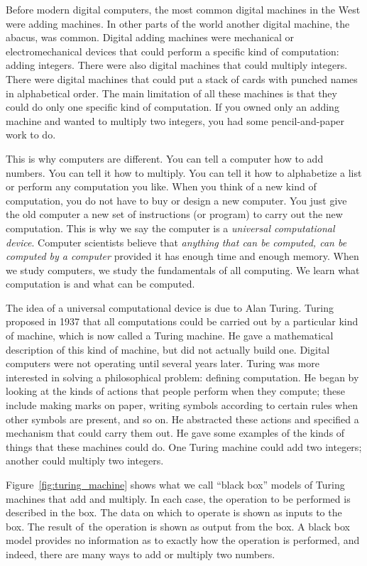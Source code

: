 \documentclass{patt}
\begin{document}
Before modern digital computers, the most common
digital machines in the West were adding machines.
In other parts of the world another digital machine, the abacus,
was common.
Digital adding machines were mechanical or electromechanical devices
that could perform a specific kind of computation: adding integers.
There were also digital machines that could multiply integers.
There were digital machines that could put a stack of cards
with punched names in alphabetical order.  The main limitation
of all these machines is that they could do only
one specific kind of computation.
If you owned only an adding machine and wanted
to multiply two integers, you had some pencil-and-paper work to do.

This is why computers are different.  You can tell a computer
how to add numbers.  You can tell it how to multiply.  You can
tell it how to alphabetize a list or perform any
computation you like.
When you think of a new kind of computation, you
do not have to buy or design a new computer.
You just give the old computer a new set of instructions (or program)
to carry out the new computation.  This is why we say the computer
is a {\em universal computational device}.  Computer
scientists believe that
{\em anything that can be computed, can be computed by a computer}
provided it has enough time and enough memory.
When we study computers, we
study the fundamentals of all computing.
We learn what computation is and what can be computed.

The idea of a
universal computational device is due to Alan Turing.
Turing proposed in 1937 that all computations could be
carried out by a particular kind of machine, which is now called
a Turing machine.  He gave a mathematical description of this
kind of machine, but did not actually build one.
Digital computers were not operating until several years later.  
Turing was more interested in solving a \nobreak philosophical
problem: defining computation.  He began by looking at the kinds
of actions that people perform when they compute; these
include making marks on paper, \nobreak writing symbols according
to certain rules when other symbols are
present, and so on.  He abstracted these actions and specified a mechanism
that could carry them out.  He gave some examples
of the kinds of things that these machines could do.  One
Turing machine could add two integers;  another
could multiply two integers.

Figure~\ref{fig:turing_machine} shows what we call ``black box''
models of Turing machines that add and multiply.  In each case,
the operation to be performed is described in the box.  The data
on which to operate is shown as inputs to the box.  The result
of~the operation is shown as output from the box.  A black
box model provides no information as to exactly how the
operation is performed, and indeed, there are many ways to
add or multiply two numbers.
\end{document}
